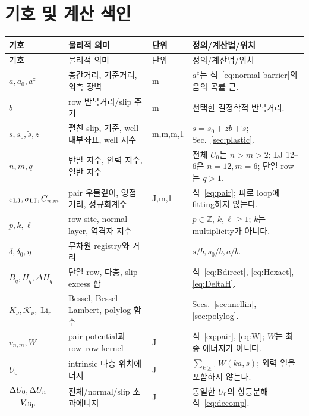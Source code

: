 \section*{\koreanfont 기호 및 계산 색인}
\label{sec:symbols-ko}
\small
\begin{longtable}{>{\raggedright\arraybackslash}p{}>{\raggedright\arraybackslash}p{}>{\raggedright\arraybackslash}p{}>{\raggedright\arraybackslash}p{}}
\toprule 기호 & 물리적 의미 & 단위 & 정의/계산법/위치\\ \midrule
\endfirsthead\toprule 기호 & 물리적 의미 & 단위 & 정의/계산법/위치\\ \midrule\endhead\bottomrule\endfoot
$a,a_0,a^\ddagger$ & 층간거리, 기준거리, 외측 장벽 & m & $a^\ddagger$는 식~\eqref{eq:normal-barrier}의 음의 곡률 근.\\
$b$ & row 반복거리/slip 주기 & m & 선택한 결정학적 반복거리.\\
$s,s_0,\widetilde s,z$ & 펼친 slip, 기준, well 내부좌표, well 지수 & m,m,m,1 & $s=s_0+zb+\widetilde s$; Sec.~\ref{sec:plastic}.\\
$n,m,q$ & 반발 지수, 인력 지수, 일반 지수 & 1 & 전체 $U_0$는 $n>m>2$; LJ 12--6은 $n=12,m=6$; 단일 row는 $q>1$.\\
$\varepsilon_{\mathrm{LJ}},\sigma_{\mathrm{LJ}},C_{n,m}$ & pair 우물깊이, 영점거리, 정규화계수 & J,m,1 & 식~\eqref{eq:pair}; 피로 loop에 fitting하지 않는다.\\
$p,k,\ell$ & row site, normal layer, 역격자 지수 & 1 & $p\in\mathbb Z$, $k,\ell\ge1$; $k$는 multiplicity가 아니다.\\
$\delta,\delta_0,\eta$ & 무차원 registry와 거리 & 1 & $s/b,s_0/b,a/b$.\\
$B_q,H_q,\Delta H_q$ & 단일-row, 다층, slip-excess 합 & 1 & 식~\eqref{eq:Bdirect}, \eqref{eq:Hexact}, \eqref{eq:DeltaH}.\\
$K_\nu,\mathcal K_\nu,\operatorname{Li}_r$ & Bessel, Bessel--Lambert, polylog 함수 & 1 & Secs.~\ref{sec:mellin}, \ref{sec:polylog}.\\
$v_{n,m},W$ & pair potential과 row--row kernel & J & 식~\eqref{eq:pair}, \eqref{eq:W}; $W$는 최종 에너지가 아니다.\\
$U_0$ & intrinsic 다층 위치에너지 & J & $\sum_{k\ge1}W(ka,s)$; 외력 일을 포함하지 않는다.\\
$\begin{gathered}\Delta U_0,\Delta U_n\\V_{\rm slip}\end{gathered}$ & 전체/normal/slip 초과에너지 & J & 동일한 $U_0$의 항등분해 식~\eqref{eq:decomp}.\\

\end{longtable}
